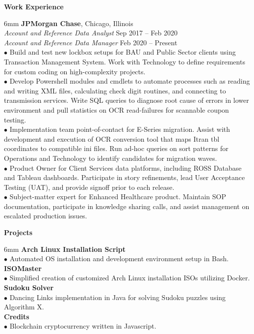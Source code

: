 \documentclass[11pt]{article}
\newcommand{\sectionheader}[1]{\noindent \textbf{\large #1}}
\newenvironment{sectionbody}{\begin{adjustwidth}{6mm}{}}{\end{adjustwidth}}
\begin{document}
\sectionheader{Work Experience}
\begin{sectionbody}
{\bf JPMorgan Chase}, Chicago, Illinois \\
\textit{Account and Reference Data Analyst} \hfill Sep 2017 -- Feb 2020 \\
\textit{Account and Reference Data Manager} \hfill Feb 2020 -- Present \\
$\bullet$ Build and test new lockbox setups for BAU and Public Sector clients using Transaction Management System. Work with Technology to define requirements for custom coding on high-complexity projects. \\
$\bullet$ Develop Powershell modules and cmdlets to automate processes such as reading and writing XML files, calculating check digit routines, and connecting to transmission services. Write SQL queries to diagnose root cause of errors in lower environment and pull statistics on OCR read-failures for scannable coupon testing. \\
$\bullet$ Implementation team point-of-contact for E-Series migration. Assist with development and execution of OCR conversion tool that maps Itran tbl coordinates to compatible ini files. Run ad-hoc queries on sort patterns for Operations and Technology to identify candidates for migration waves. \\
$\bullet$ Product Owner for Client Services data platforms, including ROSS Database and Tableau dashboards. Participate in story refinements, lead User Acceptance Testing (UAT), and provide signoff prior to each release. \\
$\bullet$ Subject-matter expert for Enhanced Healthcare product. Maintain SOP documentation, participate in knowledge sharing calls, and assist management on escalated production issues. \\
\end{sectionbody}

\vspace{2mm}

\sectionheader{Projects}
\begin{sectionbody}
{\bf Arch Linux Installation Script} \\
$\bullet$ Automated OS installation and development environment setup in Bash. \\
{\bf ISOMaster} \\
$\bullet$ Simplified creation of customized Arch Linux installation ISOs utilizing Docker. \\
{\bf Sudoku Solver} \\
$\bullet$ Dancing Links implementation in Java for solving Sudoku puzzles using Algorithm X. \\
{\bf Credits} \\
$\bullet$ Blockchain cryptocurrency written in Javascript.
\end{sectionbody}
\end{document}
